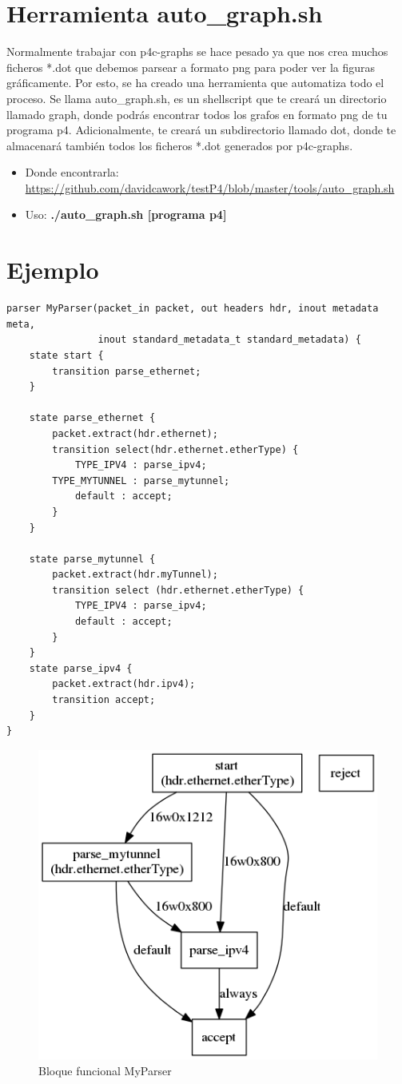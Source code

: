 \section{Herramienta auto\_graph.sh}
Normalmente trabajar con p4c-graphs se hace pesado ya que nos crea muchos ficheros *.dot que debemos parsear a formato png para poder ver la figuras gráficamente. \newline
\newline
Por esto, se ha creado una herramienta que automatiza todo el proceso. Se llama auto\_graph.sh, es un shellscript que te creará un directorio llamado graph, donde podrás encontrar todos los grafos en formato png de tu programa p4. Adicionalmente, te creará un subdirectorio llamado dot, donde te almacenará también todos los ficheros *.dot generados por p4c-graphs.
\begin{itemize}
    \item Donde encontrarla: \url{https://github.com/davidcawork/testP4/blob/master/tools/auto_graph.sh}
    \item Uso: \textbf{./auto\_graph.sh [programa p4]}
\end{itemize}
\newpage
\section{Ejemplo}

\begin{verbatim}
parser MyParser(packet_in packet, out headers hdr, inout metadata meta, 
                inout standard_metadata_t standard_metadata) {
    state start {
        transition parse_ethernet;
    }

    state parse_ethernet { 
        packet.extract(hdr.ethernet);
        transition select(hdr.ethernet.etherType) {
            TYPE_IPV4 : parse_ipv4;
	    TYPE_MYTUNNEL : parse_mytunnel;
            default : accept;
        }
    }
    
    state parse_mytunnel {
	    packet.extract(hdr.myTunnel);
	    transition select (hdr.ethernet.etherType) {
		    TYPE_IPV4 : parse_ipv4;
		    default : accept;
	    }
    }
    state parse_ipv4 {
        packet.extract(hdr.ipv4);
        transition accept;
    }
}
\end{verbatim}
\begin{figure}[!htb]
  \centering
    \includegraphics[width=0.6\linewidth]{./img/test/17.png}
    \caption{Bloque funcional MyParser}
  \label{fig:yo}
\end{figure}





